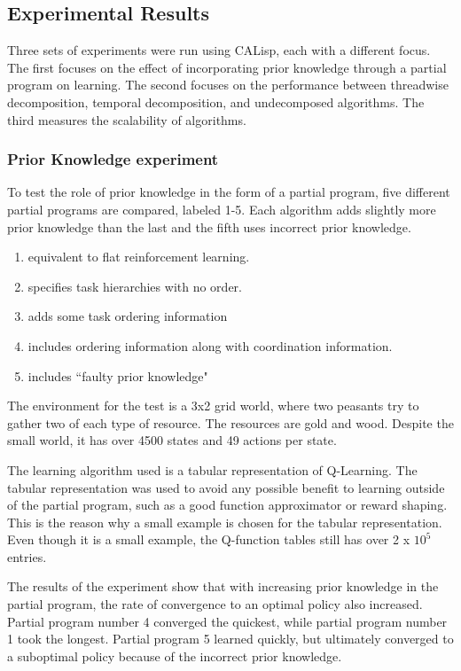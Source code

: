 \documentclass[jair,twoside,11pt,theapa]{article}
\begin{document}
\subsection{Experimental Results}
\label{Experiments}
Three sets of experiments were run using CALisp, each with a different focus. The first focuses on the effect of incorporating prior knowledge through a partial program on learning. The second focuses on the performance between threadwise decomposition, temporal decomposition, and undecomposed algorithms. The third measures the scalability of algorithms. 

\subsubsection{Prior Knowledge experiment}
To test the role of prior knowledge in the form of a partial program, five different partial programs are compared, labeled 1-5. Each algorithm adds slightly more prior knowledge than the last and the fifth uses incorrect prior knowledge. 
\begin{enumerate}
\item equivalent to flat reinforcement learning.
\item specifies task hierarchies with no order.
\item adds some task ordering information
\item includes ordering information along with coordination information.
\item includes ``faulty prior knowledge"
\end{enumerate}

The environment for the test is a 3x2 grid world, where two peasants try to gather two of each type of resource. The resources are gold and wood. Despite the small world, it has over 4500 states and 49 actions per state. 

The learning algorithm used is a tabular representation of Q-Learning. The tabular representation was used to avoid any possible benefit to learning outside of the partial program, such as a good function approximator or reward shaping. This is the reason why a small example is chosen for the tabular representation. Even though it is a small example, the Q-function tables still has over 2 x $10^5$ entries. 

The results of the experiment show that with increasing prior knowledge in the partial program, the rate of convergence to an optimal policy also increased. Partial program number 4 converged the quickest, while partial program number 1 took the longest. Partial program 5 learned quickly, but ultimately converged to a suboptimal policy because of the incorrect prior knowledge.
\end{document}
